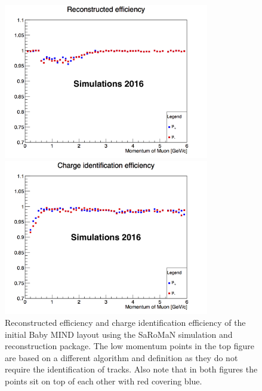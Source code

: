 \begin{figure}[h!]
\centering
\includegraphics[width=0.8\textwidth]{figures/oldStudies/oldRecEff.png}

\includegraphics[width=0.8\textwidth]{figures/oldStudies/oldChargeID.png}
\caption{Reconstructed efficiency and charge identification efficiency of the initial Baby MIND layout using the SaRoMaN simulation and reconstruction package. The low momentum points in the top figure are based on a different algorithm and definition as they do not require the identification of tracks. Also note that in both figures the points sit on top of each other with red covering blue.}
\label{fig:oldMIND2}
\end{figure}

